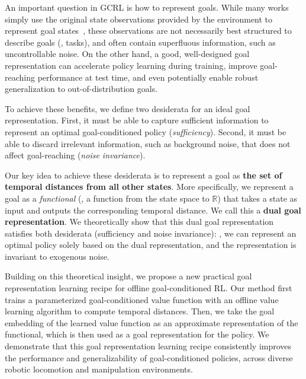 \documentclass[final]{article} %
\theoremstyle{plain}
\theoremstyle{definition}
\theoremstyle{remark}
\begin{document}
%

%
%
%
%
%
%
%
%

An important question in GCRL is how to represent goals.
While many works simply use the original state observations
provided by the environment to represent goal states~\citep{gcrl_kaelbling1993, ogbench_park2025},
these observations are not necessarily best structured to describe goals (\ie, tasks),
and often contain superfluous information, such as uncontrollable noise.
%
On the other hand, a good, well-designed goal representation can accelerate policy learning during training,
improve goal-reaching performance at test time,
and even potentially enable robust generalization to out-of-distribution goals.

To achieve these benefits, we define two desiderata for an ideal goal representation.
First, it must be able to capture sufficient information to represent an optimal goal-conditioned policy (\emph{sufficiency}).
Second, it must be able to discard irrelevant information, such as background noise, that does not affect goal-reaching (\emph{noise invariance}).

%
%
%
%
%
%
%
%
%
%
%
%
%
%
%
%


Our key idea to achieve these desiderata is to represent a goal as \textbf{the set of temporal distances from all other states}.
More specifically, we represent a goal as a \emph{functional} (\ie, a function from the state space to $\mathbb{R}$)
that takes a state as input and outputs the corresponding temporal distance.
%
We call this a \textbf{dual goal representation}.
We theoretically show that this dual goal representation satisfies both desiderata (sufficiency and noise invariance):
\ie, we can represent an optimal policy solely based on the dual representation, and the representation is invariant to exogenous noise.
%

Building on this theoretical insight, we propose a new practical goal representation learning recipe for offline goal-conditioned RL.
Our method first trains a parameterized goal-conditioned value function with an offline value learning algorithm to compute temporal distances.
Then, we take the goal embedding of the learned value function as an approximate representation of the functional,
which is then used as a goal representation for the policy.
We demonstrate that this goal representation learning recipe consistently improves the performance and generalizability of goal-conditioned policies,
across diverse robotic locomotion and manipulation environments.
\end{document}
